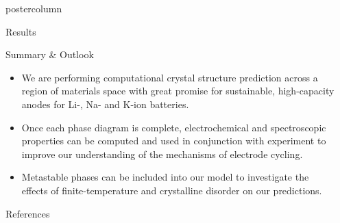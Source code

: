 \documentclass{beamer}
\begin{document}
\begin{frame}
\begin{columns}
\begin{column}{.37\textwidth}
\begin{beamercolorbox}[center]{postercolumn}
\begin{minipage}{.98\textwidth}
{\begin{myblock}{Results}
          \end{myblock}
          \begin{myblock}{Summary \& Outlook}
              \begin{itemize}
                  \item We are performing computational crystal structure prediction across a region of materials space with great promise for sustainable, high-capacity anodes for Li-, Na- and K-ion batteries.
                  \item Once each phase diagram is complete, electrochemical and spectroscopic properties can be computed and used in conjunction with experiment to improve our understanding of the mechanisms of electrode cycling.
                  \item Metastable phases can be included into our model to investigate the effects of finite-temperature and crystalline disorder on our predictions.
                \end{itemize}
            \end{myblock}
					\begin{myblock}{References}
						\footnotesize
            
						
					\end{myblock}\vfill
		}\end{minipage}\end{beamercolorbox}
	\end{column}
  \begin{column}{0.01\textwidth}
    \end{column}
\end{columns}
\end{frame}
\end{document}
